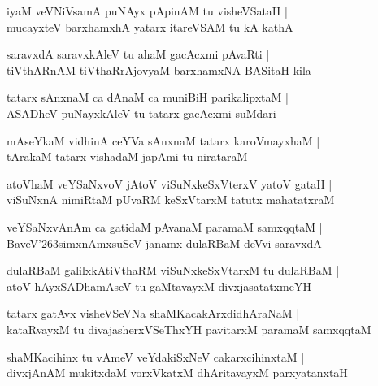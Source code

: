 \documentclass[twoside,12pt,openright]{book}
\def\S{\char'263}
\newcounter{shloka}[chapter]
\begin{document}
\begin{shloka}%
iyaM veVNiVsamA puNAyx pApinAM tu visheVSataH |\\
mucayxteV barxhamxhA yatarx itareVSAM  tu kA kathA 
\end{shloka}

\begin{shloka}%
saravxdA saravxkAleV tu ahaM gacAcxmi pAvaRti |\\
tiVthARnAM tiVthaRrAjovyaM barxhamxNA BASitaH kila
\end{shloka}

\begin{shloka}%
tatarx sAnxnaM ca dAnaM ca muniBiH parikalipxtaM |\\
ASADheV puNayxkAleV tu tatarx gacAcxmi suMdari 
\end{shloka}

\begin{shloka}%
mAseYkaM vidhinA ceYVa sAnxnaM tatarx karoVmayxhaM |\\
tArakaM tatarx vishadaM japAmi tu nirataraM 
\end{shloka}

\begin{shloka}%
atoVhaM veYSaNxvoV jAtoV viSuNxkeSxVterxV yatoV gataH |\\
viSuNxnA nimiRtaM pUvaRM keSxVtarxM tatutx mahatatxraM 
\end{shloka}

\begin{shloka}%
veYSaNxvAnAm ca gatidaM pAvanaM paramaM samxqqtaM |\\
BaveV\S simxnAmxsuSeV janamx dulaRBaM deVvi saravxdA 
\end{shloka}

\begin{shloka}%
dulaRBaM galilxkAtiVthaRM viSuNxkeSxVtarxM tu dulaRBaM |\\
atoV hAyxSADhamAseV tu gaMtavayxM divxjasatatxmeYH 
\end{shloka}

\begin{shloka}%
tatarx gatAvx visheVSeVNa shaMKacakArxdidhAraNaM |\\
kataRvayxM tu divajasherxVSeThxYH pavitarxM paramaM samxqqtaM 
\end{shloka}

\begin{shloka}%
shaMKacihinx tu vAmeV veYdakiSxNeV cakarxcihinxtaM |\\
divxjAnAM mukitxdaM vorxVkatxM dhAritavayxM parxyatanxtaH 
\end{shloka}
\end{document}
